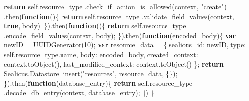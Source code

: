 \documentclass[12pt,polish,a4paper,]{report}
\newenvironment{Shaded}{}{}
\newcommand{\KeywordTok}[1]{\textcolor[rgb]{0.00,0.44,0.13}{\textbf{{#1}}}}
\newcommand{\DataTypeTok}[1]{\textcolor[rgb]{0.56,0.13,0.00}{{#1}}}
\newcommand{\DecValTok}[1]{\textcolor[rgb]{0.25,0.63,0.44}{{#1}}}
\newcommand{\StringTok}[1]{\textcolor[rgb]{0.25,0.44,0.63}{{#1}}}
\newcommand{\VariableTok}[1]{\textcolor[rgb]{0.10,0.09,0.49}{{#1}}}
\newcommand{\ControlFlowTok}[1]{\textcolor[rgb]{0.00,0.44,0.13}{\textbf{{#1}}}}
\newcommand{\OperatorTok}[1]{\textcolor[rgb]{0.40,0.40,0.40}{{#1}}}
\newcommand{\AttributeTok}[1]{\textcolor[rgb]{0.49,0.56,0.16}{{#1}}}
\newcommand{\NormalTok}[1]{{#1}}
\begin{document}
\begin{enumerate}
\begin{Shaded}
\begin{Highlighting}[]
    \ControlFlowTok{return} \VariableTok{self}\NormalTok{.}\AttributeTok{resource_type}
      \NormalTok{.}\AttributeTok{check_if_action_is_allowed}\NormalTok{(context}\OperatorTok{,} \StringTok{"create"}\NormalTok{)}
    \NormalTok{.}\AttributeTok{then}\NormalTok{(}\KeywordTok{function}\NormalTok{()}\OperatorTok{\{}
        \ControlFlowTok{return} \VariableTok{self}\NormalTok{.}\AttributeTok{resource_type}
          \NormalTok{.}\AttributeTok{validate_field_values}\NormalTok{(context}\OperatorTok{,} \KeywordTok{true}\OperatorTok{,} \NormalTok{body)}\OperatorTok{;}
    \OperatorTok{\}}\NormalTok{).}\AttributeTok{then}\NormalTok{(}\KeywordTok{function}\NormalTok{()}\OperatorTok{\{}
        \ControlFlowTok{return} \VariableTok{self}\NormalTok{.}\AttributeTok{resource_type}
          \NormalTok{.}\AttributeTok{encode_field_values}\NormalTok{(context}\OperatorTok{,} \NormalTok{body)}\OperatorTok{;}
    \OperatorTok{\}}\NormalTok{).}\AttributeTok{then}\NormalTok{(}\KeywordTok{function}\NormalTok{(encoded_body)}\OperatorTok{\{}
        \KeywordTok{var} \NormalTok{newID }\OperatorTok{=} \AttributeTok{UUIDGenerator}\NormalTok{(}\DecValTok{10}\NormalTok{)}\OperatorTok{;}
        \KeywordTok{var} \NormalTok{resource_data }\OperatorTok{=} \OperatorTok{\{}
            \DataTypeTok{sealious_id}\OperatorTok{:} \NormalTok{newID}\OperatorTok{,}
            \DataTypeTok{type}\OperatorTok{:} \VariableTok{self}\NormalTok{.}\VariableTok{resource_type}\NormalTok{.}\AttributeTok{name}\OperatorTok{,}
            \DataTypeTok{body}\OperatorTok{:} \NormalTok{encoded_body}\OperatorTok{,}
            \DataTypeTok{created_context}\OperatorTok{:} \VariableTok{context}\NormalTok{.}\AttributeTok{toObject}\NormalTok{()}\OperatorTok{,}
            \DataTypeTok{last_modified_context}\OperatorTok{:} \VariableTok{context}\NormalTok{.}\AttributeTok{toObject}\NormalTok{()}
        \OperatorTok{\};}
        \ControlFlowTok{return} \VariableTok{Sealious}\NormalTok{.}\AttributeTok{Datastore}
          \NormalTok{.}\AttributeTok{insert}\NormalTok{(}\StringTok{"resources"}\OperatorTok{,} \NormalTok{resource_data}\OperatorTok{,} \OperatorTok{\{\}}\NormalTok{)}\OperatorTok{;}
    \OperatorTok{\}}\NormalTok{).}\AttributeTok{then}\NormalTok{(}\KeywordTok{function}\NormalTok{(database_entry)}\OperatorTok{\{}
        \ControlFlowTok{return} \VariableTok{self}\NormalTok{.}\AttributeTok{resource_type}
          \NormalTok{.}\AttributeTok{decode_db_entry}\NormalTok{(context}\OperatorTok{,} \NormalTok{database_entry)}\OperatorTok{;}
    \OperatorTok{\}}\NormalTok{)}
\OperatorTok{\}}
\end{Highlighting}
\end{Shaded}


\end{enumerate}
\end{document}
